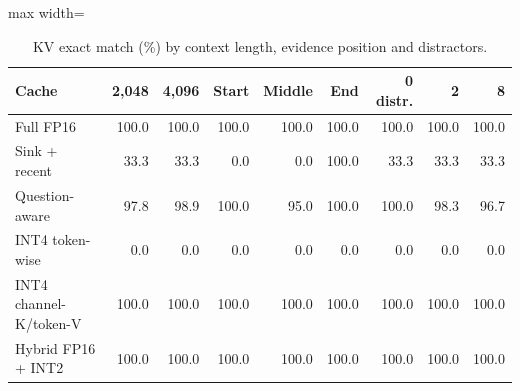 \begin{table}[!htb]
\centering
\scriptsize
\setlength{\tabcolsep}{3.5pt}
\caption{KV exact match (\%) by context length, evidence position and distractors.}
\label{tab:t2cfactor}
\begin{adjustbox}{max width=\linewidth}
\begin{tabular}{lrrrrrrrr}
\toprule
Cache & 2,048 & 4,096 & Start & Middle & End & 0 distr. & 2 & 8 \\
\midrule
Full FP16 & 100.0 & 100.0 & 100.0 & 100.0 & 100.0 & 100.0 & 100.0 & 100.0 \\
Sink + recent & 33.3 & 33.3 & 0.0 & 0.0 & 100.0 & 33.3 & 33.3 & 33.3 \\
Question-aware & 97.8 & 98.9 & 100.0 & 95.0 & 100.0 & 100.0 & 98.3 & 96.7 \\
INT4 token-wise & 0.0 & 0.0 & 0.0 & 0.0 & 0.0 & 0.0 & 0.0 & 0.0 \\
INT4 channel-K/token-V & 100.0 & 100.0 & 100.0 & 100.0 & 100.0 & 100.0 & 100.0 & 100.0 \\
Hybrid FP16 + INT2 & 100.0 & 100.0 & 100.0 & 100.0 & 100.0 & 100.0 & 100.0 & 100.0 \\
\bottomrule
\end{tabular}
\end{adjustbox}
\end{table}
